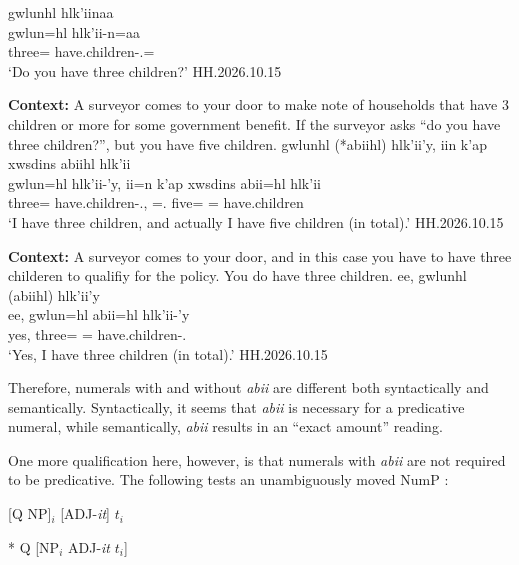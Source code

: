 \documentclass{article}
\begin{document}
\begin{exe}
    \ex 
    \begin{xlist}
        \item \glll gwlunhl hlk'iinaa \\
    gwlun=hl hlk'ii-n=aa \\
    three=\Cn{} have.children-\Ssg{}.\Ii{}=\Q{} \\
    `Do you have three children?' \hfill HH.2026.10.15
       \item \textbf{Context:} A surveyor comes to your door to make note of households that have 3 children or more for some government benefit. If the surveyor asks ``do you have three children?'', but you have five children. 
        \glll gwlunhl (*abiihl) hlk'ii'y, iin k'ap xwsdins abiihl hlk'ii  \\
    gwlun=hl hlk'ii-'y, ii=n k'ap xwsdins abii=hl hlk'ii  \\
    three=\Cn{} have.children-\Fsg{}.\Ii{}, \Ccnj{}=\Fsg{}.\I{} \Verum{} five=\Cn{} \Cnt{}=\Cn{} have.children \\
    `I have three children, and actually I have five children (in total).' \hfill HH.2026.10.15
    \item \textbf{Context:} A surveyor comes to your door, and in this case you have to have three childeren to qualifiy for the policy. You do have three children. 
        \glll ee, gwlunhl (abiihl) hlk'ii'y \\
    ee, gwlun=hl abii=hl hlk'ii-'y \\
    yes, three=\Cn{} \Cnt{}=\Cn{} have.children-\Fsg{}.\Ii{} \\
    `Yes, I have three children (in total).' \hfill HH.2026.10.15
    \end{xlist}
\end{exe}

Therefore, numerals with and without \textit{abii} are different both syntactically and semantically. Syntactically, it seems that \textit{abii} is necessary for a predicative numeral, while semantically, \textit{abii} results in an ``exact amount'' reading.

One more qualification here, however, is that numerals with \textit{abii} are not required to be predicative. The following tests an unambiguously moved NumP \parencite{forbesAdjectives2012}:

\begin{exe}
    \ex \begin{xlist}
        \item {} [Q NP]$_{i}$ [ADJ-\textit{it}] $t_{i}$
        \item {} * Q [NP$_{i}$ ADJ-\textit{it} $t_{i}$]
    \end{xlist}
\end{exe}
\end{document}
